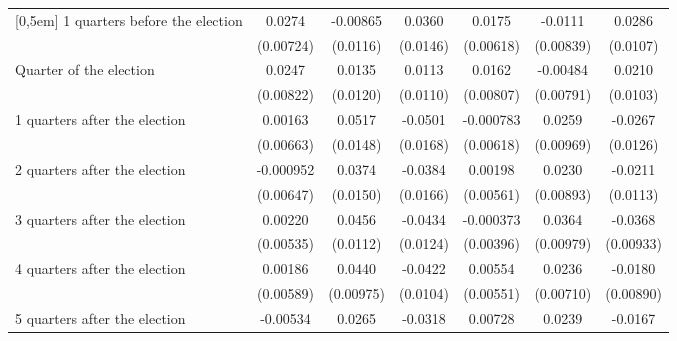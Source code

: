 \begin{table}[!ht]
\begin{tabular}{l*{6}{c}}
[0,5em]
 1 quarters before the election&      0.0274\sym{***}&    -0.00865         &      0.0360\sym{*}  &      0.0175\sym{**} &     -0.0111         &      0.0286\sym{**} \\
                    &   (0.00724)         &    (0.0116)         &    (0.0146)         &   (0.00618)         &   (0.00839)         &    (0.0107)         \\
[0,5em]
Quarter of the election&      0.0247\sym{**} &      0.0135         &      0.0113         &      0.0162\sym{*}  &    -0.00484         &      0.0210\sym{*}  \\
                    &   (0.00822)         &    (0.0120)         &    (0.0110)         &   (0.00807)         &   (0.00791)         &    (0.0103)         \\
[0,5em]
 1 quarters after the election&     0.00163         &      0.0517\sym{***}&     -0.0501\sym{**} &   -0.000783         &      0.0259\sym{**} &     -0.0267\sym{*}  \\
                    &   (0.00663)         &    (0.0148)         &    (0.0168)         &   (0.00618)         &   (0.00969)         &    (0.0126)         \\
[0,5em]
 2 quarters after the election&   -0.000952         &      0.0374\sym{*}  &     -0.0384\sym{*}  &     0.00198         &      0.0230\sym{**} &     -0.0211         \\
                    &   (0.00647)         &    (0.0150)         &    (0.0166)         &   (0.00561)         &   (0.00893)         &    (0.0113)         \\
[0,5em]
 3 quarters after the election&     0.00220         &      0.0456\sym{***}&     -0.0434\sym{***}&   -0.000373         &      0.0364\sym{***}&     -0.0368\sym{***}\\
                    &   (0.00535)         &    (0.0112)         &    (0.0124)         &   (0.00396)         &   (0.00979)         &   (0.00933)         \\
[0,5em]
 4 quarters after the election&     0.00186         &      0.0440\sym{***}&     -0.0422\sym{***}&     0.00554         &      0.0236\sym{***}&     -0.0180\sym{*}  \\
                    &   (0.00589)         &   (0.00975)         &    (0.0104)         &   (0.00551)         &   (0.00710)         &   (0.00890)         \\
[0,5em]
 5 quarters after the election&    -0.00534         &      0.0265\sym{*}  &     -0.0318\sym{**} &     0.00728         &      0.0239\sym{**} &     -0.0167         \\

\end{tabular}
\end{table}

